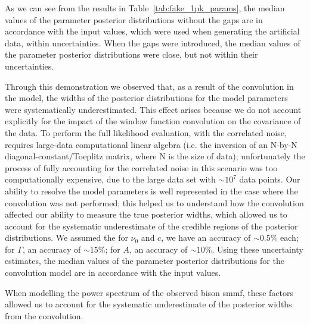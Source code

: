 As we can see from the results in Table~\ref{tab:fake_1pk_params}, the median values of the parameter posterior distributions without the gaps are in accordance with the input values, which were used when generating the artificial data, within uncertainties. When the gaps were introduced, the median values of the parameter posterior distributions were close, but not within their uncertainties. %

Through this demonstration we observed that, as a result of the convolution in the model, the widths of the posterior distributions for the model parameters were systematically underestimated. This effect arises because we do not account explicitly for the impact of the window function convolution on the
covariance of the data. To perform the full likelihood evaluation, with the correlated noise, requires large-data computational linear algebra (i.e. the inversion of an N-by-N diagonal-constant/Toeplitz matrix, where N is the size of data); unfortunately the process of fully accounting for the correlated noise in this scenario was too computationally expensive, due to the large data set with $\sim 10^7$ data points. Our ability to resolve the model parameters is well represented in the case where the convolution was not performed; this helped us to understand how the convolution affected our ability to measure
the true posterior widths, which allowed us to account for the systematic underestimate of the credible regions of the posterior distributions. We assumed the for $\nu_0$ and $c$, we have an accuracy of $\sim 0.5\%$ each; for $\Gamma$, an accuracy of $\sim 15\%$; for $A$, an accuracy of $\sim 10\%$. Using these uncertainty estimates, the median values of the parameter posterior distributions for the convolution model are in accordance with the input values.

When modelling the power spectrum of the observed \gls{bison} \gls{smmf}, these factors allowed us to account for the systematic underestimate of the posterior widths from the convolution.




